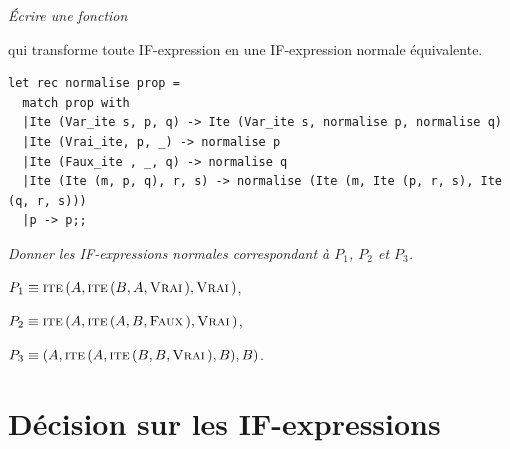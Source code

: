 \begin{Exercise}\it 
Écrire une fonction  

qui transforme toute IF-expression en une IF-expression normale équivalente.
\end{Exercise}
\begin{Answer} 
\begin{lstlisting}
let rec normalise prop = 
  match prop with
  |Ite (Var_ite s, p, q) -> Ite (Var_ite s, normalise p, normalise q)
  |Ite (Vrai_ite, p, _) -> normalise p
  |Ite (Faux_ite , _, q) -> normalise q
  |Ite (Ite (m, p, q), r, s) -> normalise (Ite (m, Ite (p, r, s), Ite (q, r, s)))
  |p -> p;;
\end{lstlisting}
\end{Answer}
\begin{Exercise}\it Donner les IF-expressions normales correspondant à $P_1$, $P_2$ et $P_3$.
\end{Exercise}
\begin{Answer} $P_1 \equiv \text{\sc ite}\, (A, \text{\sc ite}\,(B, A, \text{\sc Vrai}\,), \text{\sc Vrai}\,)$,

$P_2 \equiv \text{\sc ite}\, (A, \text{\sc ite}\, (A, B, \text{\sc Faux}\,), \text{\sc Vrai}\,)$,

$P_3 \equiv (A, \text{\sc ite}\, (A, \text{\sc ite}\, (B, B, \text{\sc Vrai}\,), B), B)$.
\end{Answer}
\section{Décision sur les IF-expressions}
